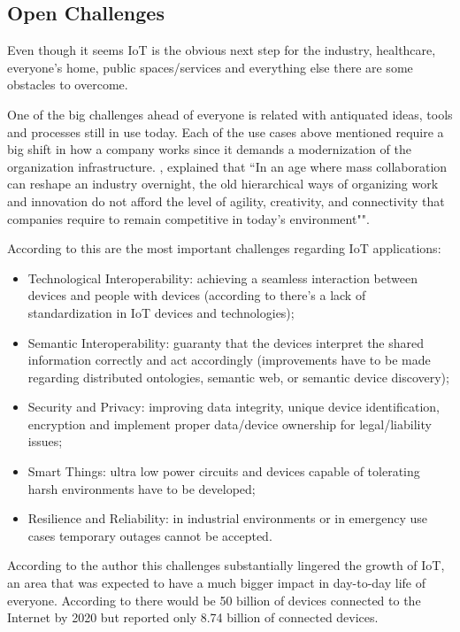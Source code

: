 \subsection{Open Challenges}
\label{subsec:stateofart:iot:challenges}

Even though it seems \gls{IoT} is the obvious next step for the industry, healthcare, everyone's home, public spaces/services and everything else there are some obstacles to overcome.

One of the big challenges ahead of everyone is related with antiquated ideas, tools and processes still in use today.
Each of the use cases above mentioned require a big shift in how a company works since it demands a modernization of the organization infrastructure.
\cite{tapscott2006wikinomics}, explained that ``In an age where mass collaboration can reshape an industry overnight, the old hierarchical ways of organizing work and innovation do not afford the level of agility, creativity, and connectivity that companies require to remain competitive in today's environment"".

According to \cite{7073822} this are the most important challenges regarding \gls{IoT} applications:

\begin{itemize}
    \item Technological Interoperability: achieving a seamless interaction between devices and people with devices (according to \cite{al2016iot} there's a lack of standardization in \gls{IoT} devices and technologies);
    \item Semantic Interoperability: guaranty that the devices interpret the shared information
correctly and act accordingly (improvements have to be made regarding distributed ontologies, semantic web, or semantic device discovery);
    \item Security and Privacy: improving data integrity, unique device identification, encryption and implement proper data/device ownership for legal/liability issues;
    \item Smart Things: ultra low power circuits and devices capable of tolerating harsh environments have to be developed;
    \item Resilience and Reliability: in industrial environments or in emergency use cases temporary outages cannot be accepted.
\end{itemize}

According to the author this challenges substantially lingered the growth of \gls{IoT}, an area that was expected to have a much bigger impact in day-to-day life of everyone. According to \cite{iot-cisco-prediction} there would be 50 billion of devices connected to the Internet by 2020 but \cite{statista-number-devices} reported only 8.74 billion of connected devices.

